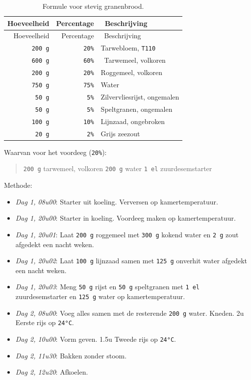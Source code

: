 \documentclass[
  11pt,
  dutch,
]{memoir}
\providecommand{\tightlist}{%
  \setlength{\itemsep}{0pt}\setlength{\parskip}{0pt}}
\begin{document}
\begin{longtable}[]{@{}rrl@{}}
\caption{Formule voor stevig granenbrood.}\tabularnewline
\toprule
Hoeveelheid & Percentage & ~Beschrijving\tabularnewline
\midrule
\endfirsthead
\toprule
Hoeveelheid & Percentage & ~Beschrijving\tabularnewline
\midrule
\endhead
\texttt{200\ g} & \texttt{20\%} & Tarwebloem,
\texttt{T110}\tabularnewline
\texttt{600\ g} & \texttt{60\%} & ~Tarwemeel, volkoren\tabularnewline
\texttt{200\ g} & \texttt{20\%} & Roggemeel, volkoren\tabularnewline
\texttt{750\ g} & \texttt{75\%} & Water\tabularnewline
~\texttt{50\ g} & \texttt{5\%} & Zilvervliesrijst,
ongemalen\tabularnewline
\texttt{50\ g} & \texttt{5\%} & Speltgranen, ongemalen\tabularnewline
\texttt{100\ g} & ~\texttt{10\%} & Lijnzaad, ongebroken\tabularnewline
\texttt{20\ g} & \texttt{2\%} & Grijs zeezout\tabularnewline
\bottomrule
\end{longtable}

Waarvan voor het voordeeg (\texttt{20\%}):

\begin{quote}
\texttt{200\ g} tarwemeel, volkoren \newline \texttt{200\ g} water
\newline \texttt{1\ el} zuurdesemstarter
\end{quote}

Methode:

\begin{itemize}
\tightlist
\item
  \emph{Dag 1, 08u00}: Starter uit koeling. Verversen op
  kamertemperatuur.
\item
  \emph{Dag 1, 20u00}: Starter in koeling. Voordeeg maken op
  kamertemperatuur.
\item
  \emph{Dag 1, 20u01}: Laat \texttt{200\ g} roggemeel met
  \texttt{300\ g} kokend water en \texttt{2\ g} zout afgedekt een nacht
  weken.
\item
  \emph{Dag 1, 20u02}: Laat \texttt{100\ g} lijnzaad samen met
  \texttt{125\ g} onverhit water afgedekt een nacht weken.
\item
  \emph{Dag 1, 20u03}: Meng \texttt{50\ g} rijst en \texttt{50\ g}
  speltgranen met \texttt{1\ el} zuurdesemstarter en \texttt{125\ g}
  water op kamertemperatuur.
\item
  \emph{Dag 2, 08u00}: Voeg alles samen met de resterende
  \texttt{200\ g} water. Kneden. 2u Eerste rijs op \texttt{24°C}.
\item
  \emph{Dag 2, 10u00}: Vorm geven. 1.5u Tweede rijs op \texttt{24°C}.
\item
  \emph{Dag 2, 11u30}: Bakken zonder stoom.
\item
  \emph{Dag 2, 12u20}: Afkoelen.
\end{itemize}
\end{document}
